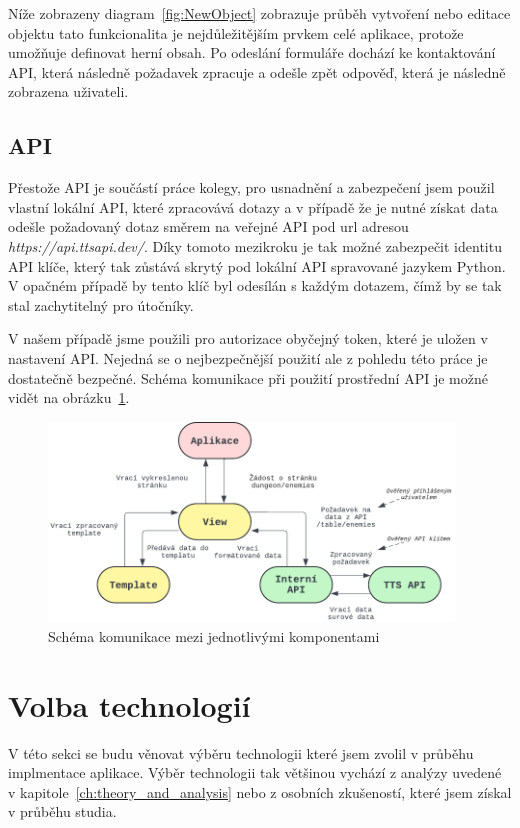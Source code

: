 Níže zobrazeny diagram~\ref{fig:NewObject} zobrazuje průběh vytvoření nebo editace objektu tato funkcionalita je nejdůležitějším prvkem celé aplikace, protože umožňuje definovat herní obsah. Po odeslání formuláře dochází ke kontaktování API, která následně požadavek zpracuje a odešle zpět odpověď, která je následně zobrazena uživateli.


\subsection{API}
\label{subsec:implementation-api}
Přestože API je součástí práce kolegy, pro usnadnění a zabezpečení jsem použil vlastní lokální API, které zpracovává dotazy a v případě že je nutné získat data odešle požadovaný dotaz směrem na veřejné API pod url adresou \textit{https://api.ttsapi.dev/}. Díky tomoto mezikroku je tak možné zabezpečit identitu API klíče, který tak zůstává skrytý pod lokální API spravované jazykem Python. V opačném případě by tento klíč byl odesílán s každým dotazem, čímž by se tak stal zachytitelný pro útočníky.

V našem případě jsme použili pro autorizace obyčejný token, které je uložen v nastavení API. Nejedná se o nejbezpečnější použití ale z pohledu této práce je dostatečně bezpečné. Schéma komunikace při použití prostřední API je možné vidět na obrázku~\ref{fig:api_communication}.

\begin{figure}[H]
    \centering
    \includegraphics[width=0.96\textwidth]{diagrams/API_Communication}
    \caption{Schéma komunikace mezi jednotlivými komponentami}
    \label{fig:api_communication}
\end{figure}

\section{Volba technologií}
\label{sec:implementation-technologies}
V této sekci se budu věnovat výběru technologii které jsem zvolil v průběhu implmentace aplikace. Výběr technologii tak většinou vychází z analýzy uvedené v kapitole~\ref{ch:theory_and_analysis} nebo z osobních zkušeností, které jsem získal v průběhu studia.

